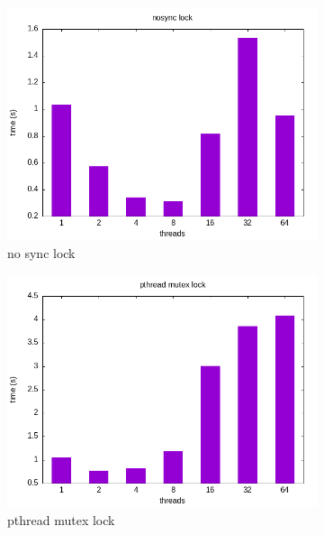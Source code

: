 \documentclass{article}
\newcommand{\eng}[1]{#1}
\begin{document}
\begin{figure}[ht]
    \centering
    \begin{subfigure}{0.45\textwidth}
        \includegraphics[width=\textwidth]{a3/plots/nosync_lock.png}
        \caption{\eng{no sync lock}}
        \label{fig:nosync}
    \end{subfigure}
    \begin{subfigure}{0.45\textwidth}
        \includegraphics[width=\textwidth]{a3/plots/pthread_mutex_lock.png}
        \caption{\eng{pthread mutex lock}}
        \label{fig:mutex}
    \end{subfigure}
    \vspace{1em}
    \begin{subfigure}{0.45\textwidth}

\end{subfigure}
\end{figure}
\end{document}
